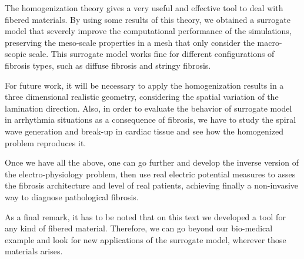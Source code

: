 The homogenization theory gives a very useful and effective tool to deal with fibered materials. By using some results of this theory, we obtained a surrogate model that severely improve the computational performance of the simulations, preserving the meso-scale properties in a mesh that only consider the macro-scopic scale. This surrogate model works fine for different configurations of fibrosis types, such as diffuse fibrosis and stringy fibrosis.

For future work, it will be necessary to apply the homogenization results in a three dimensional realistic geometry, considering the spatial variation of the lamination direction. Also, in order to evaluate the behavior of surrogate model in arrhythmia situations as a consequence of fibrosis, we have to study the spiral wave generation and break-up in cardiac tissue and see how the homogenized problem reproduces it.

Once we have all the above, one can go further and develop the inverse version of the electro-physiology problem, then use real electric potential measures to asses the fibrosis architecture and level of real patients, achieving finally a non-invasive way to diagnose pathological fibrosis.

As a final remark, it has to be noted that on this text we developed a tool for any kind of fibered material. Therefore, we can go beyond our bio-medical example and look for new applications of the surrogate model, wherever those materials arises.